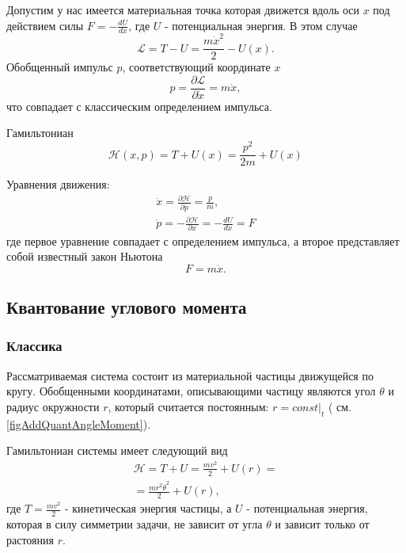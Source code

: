 \begin{example}
Допустим у нас имеется материальная точка которая движется вдоль оси
$x$ под действием силы $F = - \frac{d U}{d x}$, где $U$ -
потенциальная энергия. В этом случае
\[
\mathcal{L} = T - U = \frac{m \dot{x}^2}{2} - U(x).
\] 
Обобщенный импульс $p$, соответствующий координате $x$
\[
p = \frac{\partial \mathcal{L}}{\partial \dot{x}} = m \dot{x},
\]
что совпадает с классическим определением импульса. 

Гамильтониан 
\[
\mathcal{H}\left(x, p\right) = T + U(x) = \frac{p^2}{2 m} + U(x)
\]

Уравнения движения:
\begin{eqnarray}
\dot{x} = \frac{\partial \mathcal{H}}{\partial p} = \frac{p}{m},
\nonumber \\
\dot{p} = - \frac{\partial \mathcal{H}}{\partial x} = - \frac{d U}{d
  x} = F
\nonumber
\end{eqnarray}
где первое уравнение совпадает с определением импульса, а второе
представляет собой известный закон Ньютона
\[
F = m \ddot{x}.
\]
\end{example}

\subsection{Квантование углового момента}


 
\subsubsection{Классика}
Рассматриваемая система состоит из материальной частицы движущейся по
кругу. Обобщенными координатами, описывающими частицу являются угол
$\theta$ и радиус окружности $r$, который считается постоянным: $r =
\left. const \right|_t$ ( см. \autoref{figAddQuantAngleMoment}).

Гамильтониан системы имеет следующий вид 
\begin{eqnarray}
\mathcal{H} = T + U = \frac{m v^2}{2} + U\left( r \right) = 
\nonumber \\
= \frac{m r^2 \dot{\theta}^2 }{2} + U\left( r \right),
\nonumber
\end{eqnarray}
где $T = \frac{m v^2}{2}$ - кинетическая энергия частицы, 
а $U$ - потенциальная энергия, которая в силу симметрии задачи, не
зависит от угла $\theta$ и зависит только от растояния $r$.

